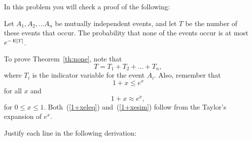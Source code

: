 \documentclass[11pt]{article}
\begin{document}


\begin{problem}
In this problem you will check a proof of the following:
\begin{theorem}\label{th:none}
Let $A_1, A_2, \dots A_n$ be mutually independent events, and let $T$ be
the number of these events that occur.  The probability that none of the
events occur is at most $e^{-\mathop{\textup{E}}\nolimits\left[T\right]}$.
\end{theorem}

To prove Theorem~\ref{th:none}, note that
\begin{equation}\label{Tsum}
T = T_1 + T_2 + \dots + T_n,
\end{equation}
where $T_i$ is the indicator variable for the event $A_i$.  Also, remember
that
\begin{equation} \label{1+xeleq}
1 + x \leq e^x
\end{equation}
for all $x$ and
\begin{equation}
1 + x \approx e^x \label{1+xesim},
\end{equation}
for $0 \leq x \leq 1$.  Both~(\ref{1+xeleq}) and~(\ref{1+xesim}) follow
from the Taylor's expansion of $e^x$.

\bparts

\ppart
Justify each line in the following derivation:



\end{problem}
\end{document}
